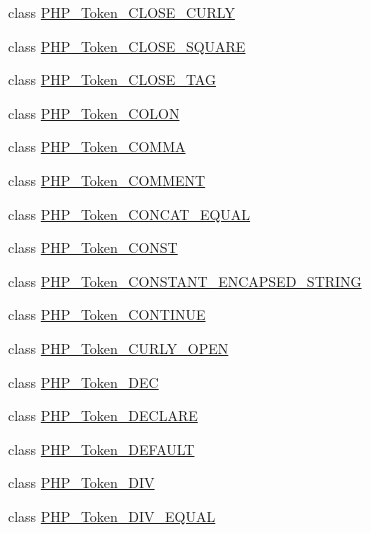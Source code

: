 \begin{DoxyCompactItemize}
\item 
class \mbox{\hyperlink{class_p_h_p___token___c_l_o_s_e___c_u_r_l_y}{P\+H\+P\+\_\+\+Token\+\_\+\+C\+L\+O\+S\+E\+\_\+\+C\+U\+R\+LY}}
\item 
class \mbox{\hyperlink{class_p_h_p___token___c_l_o_s_e___s_q_u_a_r_e}{P\+H\+P\+\_\+\+Token\+\_\+\+C\+L\+O\+S\+E\+\_\+\+S\+Q\+U\+A\+RE}}
\item 
class \mbox{\hyperlink{class_p_h_p___token___c_l_o_s_e___t_a_g}{P\+H\+P\+\_\+\+Token\+\_\+\+C\+L\+O\+S\+E\+\_\+\+T\+AG}}
\item 
class \mbox{\hyperlink{class_p_h_p___token___c_o_l_o_n}{P\+H\+P\+\_\+\+Token\+\_\+\+C\+O\+L\+ON}}
\item 
class \mbox{\hyperlink{class_p_h_p___token___c_o_m_m_a}{P\+H\+P\+\_\+\+Token\+\_\+\+C\+O\+M\+MA}}
\item 
class \mbox{\hyperlink{class_p_h_p___token___c_o_m_m_e_n_t}{P\+H\+P\+\_\+\+Token\+\_\+\+C\+O\+M\+M\+E\+NT}}
\item 
class \mbox{\hyperlink{class_p_h_p___token___c_o_n_c_a_t___e_q_u_a_l}{P\+H\+P\+\_\+\+Token\+\_\+\+C\+O\+N\+C\+A\+T\+\_\+\+E\+Q\+U\+AL}}
\item 
class \mbox{\hyperlink{class_p_h_p___token___c_o_n_s_t}{P\+H\+P\+\_\+\+Token\+\_\+\+C\+O\+N\+ST}}
\item 
class \mbox{\hyperlink{class_p_h_p___token___c_o_n_s_t_a_n_t___e_n_c_a_p_s_e_d___s_t_r_i_n_g}{P\+H\+P\+\_\+\+Token\+\_\+\+C\+O\+N\+S\+T\+A\+N\+T\+\_\+\+E\+N\+C\+A\+P\+S\+E\+D\+\_\+\+S\+T\+R\+I\+NG}}
\item 
class \mbox{\hyperlink{class_p_h_p___token___c_o_n_t_i_n_u_e}{P\+H\+P\+\_\+\+Token\+\_\+\+C\+O\+N\+T\+I\+N\+UE}}
\item 
class \mbox{\hyperlink{class_p_h_p___token___c_u_r_l_y___o_p_e_n}{P\+H\+P\+\_\+\+Token\+\_\+\+C\+U\+R\+L\+Y\+\_\+\+O\+P\+EN}}
\item 
class \mbox{\hyperlink{class_p_h_p___token___d_e_c}{P\+H\+P\+\_\+\+Token\+\_\+\+D\+EC}}
\item 
class \mbox{\hyperlink{class_p_h_p___token___d_e_c_l_a_r_e}{P\+H\+P\+\_\+\+Token\+\_\+\+D\+E\+C\+L\+A\+RE}}
\item 
class \mbox{\hyperlink{class_p_h_p___token___d_e_f_a_u_l_t}{P\+H\+P\+\_\+\+Token\+\_\+\+D\+E\+F\+A\+U\+LT}}
\item 
class \mbox{\hyperlink{class_p_h_p___token___d_i_v}{P\+H\+P\+\_\+\+Token\+\_\+\+D\+IV}}
\item 
class \mbox{\hyperlink{class_p_h_p___token___d_i_v___e_q_u_a_l}{P\+H\+P\+\_\+\+Token\+\_\+\+D\+I\+V\+\_\+\+E\+Q\+U\+AL}}

\end{DoxyCompactItemize}
